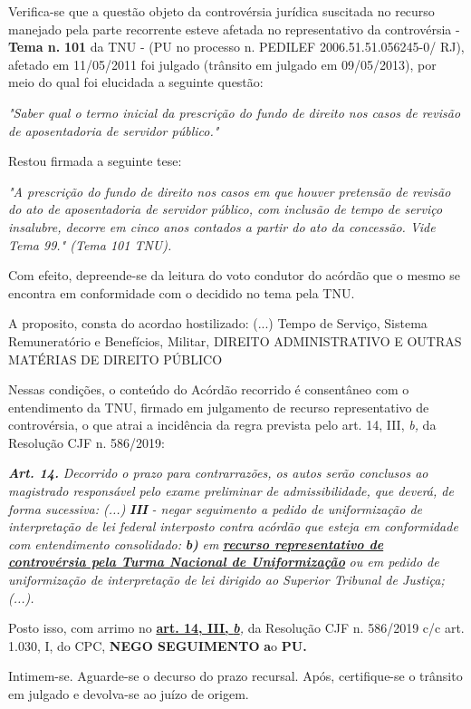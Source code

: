 \documentclass[12pt]{article}
\begin{document}
\justifying
\noindent Verifica-se que a questão objeto da controvérsia jurídica suscitada no recurso manejado pela parte recorrente esteve afetada no representativo da controvérsia - \textbf{Tema n. }\textbf{101} da TNU - (PU no processo n. PEDILEF 2006.51.51.056245-0/ RJ),  afetado em 11/05/2011 foi julgado (trânsito em julgado em 09/05/2013), por meio do qual foi elucidada a seguinte questão:

\noindent \textit{"Saber qual o termo inicial da prescrição do fundo de direito nos casos de revisão de aposentadoria de servidor público."}

\noindent Restou firmada a seguinte tese:

\noindent \textit{"A prescrição do fundo de direito nos casos em que houver pretensão de revisão do ato de aposentadoria de servidor público, com inclusão de tempo de serviço insalubre, decorre em cinco anos contados a partir do ato da concessão. Vide Tema 99." (Tema 101 TNU).}

\noindent Com efeito, depreende-se da leitura do voto condutor do acórdão que o mesmo se encontra em conformidade com o decidido no  tema pela TNU.

\noindent A proposito, consta do acordao hostilizado: (...) Tempo de Serviço, Sistema Remuneratório e Benefícios, Militar, DIREITO ADMINISTRATIVO E OUTRAS MATÉRIAS DE DIREITO PÚBLICO

\noindent Nessas condições, o conteúdo do Acórdão recorrido é consentâneo com o entendimento da TNU, firmado em julgamento de recurso representativo de controvérsia, o que atrai a incidência da regra prevista pelo art. 14, III, \textit{b,} da Resolução CJF n. 586/2019:

\noindent \textit{\textbf{Art. 14.}}\textit{ Decorrido o prazo para contrarrazões, os autos serão conclusos ao magistrado responsável pelo exame preliminar de admissibilidade, que deverá, de forma sucessiva: (...) }\textit{\textbf{III }}\textit{- negar seguimento a pedido de uniformização de interpretação de lei federal interposto contra acórdão que esteja em conformidade com entendimento consolidado: }\textit{\textbf{b)}}\textit{ em }\uline{\textit{\textbf{recurso representativo de controvérsia pela Turma Nacional de Uniformização}}}\textit{ ou em pedido de uniformização de interpretação de lei dirigido ao Superior Tribunal de Justiça;(...).}

\noindent Posto isso, com arrimo no \uline{\textbf{art. 14, III, }}\uline{\textit{\textbf{b}}}\textit{,} da Resolução CJF n. 586/2019 c/c art. 1.030, I, do CPC, \textbf{NEGO SEGUIMENTO }\textbf{a}o\textbf{ PU}\textbf{.}

\noindent Intimem-se. Aguarde-se o decurso do prazo recursal. Após, certifique-se o trânsito em julgado e devolva-se ao juízo de origem.
\end{document}
